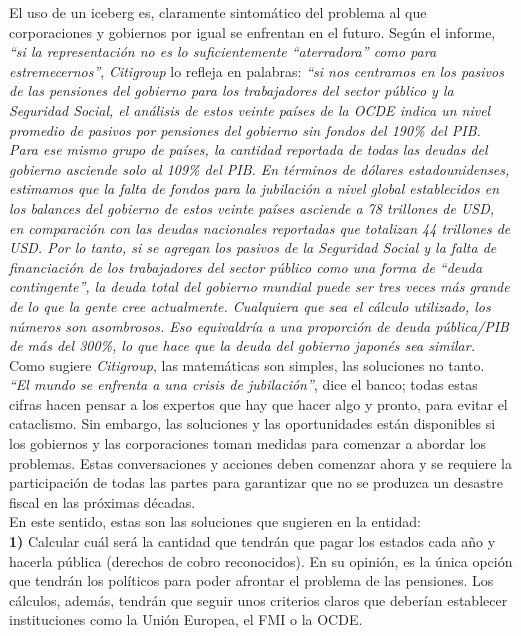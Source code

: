 El uso de un iceberg es, claramente sintom\'atico del problema al que corporaciones y gobiernos por igual se enfrentan en el futuro. Seg\'un el informe, \textit{``si la representaci\'on no es lo suficientemente ``aterradora'' como para estremecernos''}, \textit{Citigroup} lo refleja en palabras: \textit{``si nos centramos en los pasivos de las pensiones del gobierno para los trabajadores del sector p\'ublico y la Seguridad Social, el an\'alisis de estos veinte pa\'ises de la OCDE indica un nivel promedio de pasivos por pensiones del gobierno sin fondos del 190\% del PIB. Para ese mismo grupo de pa\'ises, la cantidad reportada de todas las deudas del gobierno asciende solo al 109\% del PIB. En t\'erminos de d\'olares estadounidenses, estimamos que la falta de fondos para la jubilaci\'on a nivel global establecidos en los balances del gobierno de estos veinte países asciende a 78 trillones de USD, en comparaci\'on con las deudas nacionales reportadas que totalizan 44 trillones de USD. Por lo tanto, si se agregan los pasivos de la Seguridad Social y la falta de financiaci\'on de los trabajadores del sector p\'ublico como una forma de ``deuda contingente'', la deuda total del gobierno mundial puede ser tres veces m\'as grande de lo que la gente cree actualmente. Cualquiera que sea el c\'alculo utilizado, los n\'umeros son asombrosos. Eso equivaldr\'ia a una proporci\'on de deuda p\'ublica/PIB de m\'as del 300\%, lo que hace que la deuda del gobierno japon\'es sea similar.} Como sugiere \textit{Citigroup}, las matem\'aticas son simples, las soluciones no tanto.\\ 

\textit{``El mundo se enfrenta a una crisis de jubilaci\'on''}, dice el banco; todas estas cifras hacen pensar a los expertos que hay que hacer algo y pronto, para evitar el cataclismo. Sin embargo, las soluciones y las oportunidades est\'an disponibles si los gobiernos y las corporaciones toman medidas para comenzar a abordar los problemas. Estas conversaciones y acciones deben comenzar ahora y se requiere la participaci\'on de todas las partes para garantizar que no se produzca un desastre fiscal en las pr\'oximas d\'ecadas.\\ 

\vspace{-0.3cm}
En este sentido, estas son las soluciones que sugieren en la entidad:\\

\vspace{-0.3cm}
\noindent \textbf{1)} Calcular cu\'al ser\'a la cantidad que tendr\'an que pagar los estados cada a\~no y hacerla p\'ublica (derechos de cobro reconocidos). En su opini\'on, es la \'unica opci\'on que tendr\'an los pol\'iticos para poder afrontar el problema de las pensiones.  Los c\'alculos, adem\'as, tendr\'an que seguir unos criterios claros que deber\'ian establecer instituciones como la Uni\'on Europea, el FMI o la OCDE.\\

